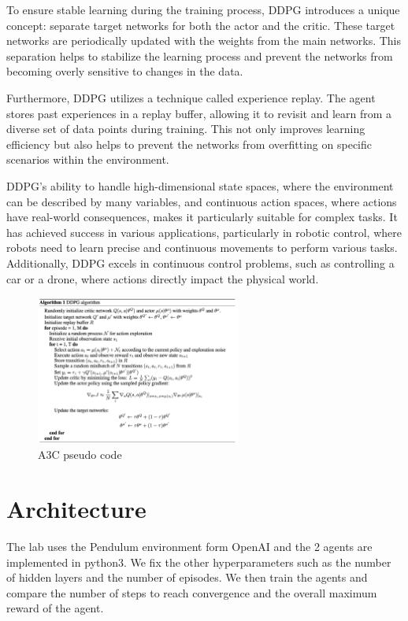 \documentclass{article}
\begin{document}
To ensure stable learning during the training process, DDPG introduces a unique
concept: separate target networks for both the actor and the critic. These
target networks are periodically updated with the weights from the main
networks. This separation helps to stabilize the learning process and prevent
the networks from becoming overly sensitive to changes in the data.

Furthermore, DDPG utilizes a technique called experience replay. The agent
stores past experiences in a replay buffer, allowing it to revisit and learn
from a diverse set of data points during training. This not only improves
learning efficiency but also helps to prevent the networks from overfitting on
specific scenarios within the environment.

DDPG's ability to handle high-dimensional state spaces, where the environment
can be described by many variables, and continuous action spaces, where actions
have real-world consequences, makes it particularly suitable for complex tasks.
It has achieved success in various applications, particularly in robotic
control, where robots need to learn precise and continuous movements to perform
various tasks. Additionally, DDPG excels in continuous control problems, such
as controlling a car or a drone, where actions directly impact the physical
world.

\begin{figure}[h]
    \centering
    \includegraphics[width=0.6\textwidth]{ddpg.png}
    \caption{A3C pseudo code}
\end{figure}

\section*{Architecture}

The lab uses the Pendulum environment form OpenAI and the 2 agents are
implemented in python3. We fix the other hyperparameters such as the number of
hidden layers and the number of episodes. We then train the agents and compare
the number of steps to reach convergence and the overall maximum reward of
the agent.
\end{document}
